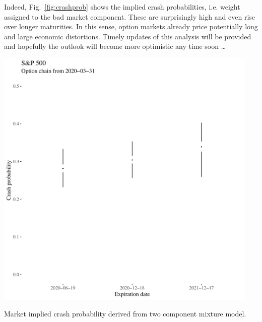 \documentclass[a4paper]{tufte-handout}
\newcommand{\fig}[1]{Fig.~\ref{fig:#1}}
\begin{document}
Indeed, \fig{crashprob} shows the implied crash probabilities,
i.e. weight assigned to the bad market component. These are
surprisingly high and even rise over longer maturities. In this sense,
option markets already price potentially long and large economic
distortions. Timely updates of this analysis will be provided and
hopefully the outlook will become more optimistic any time soon \ldots
\begin{marginfigure}
  \begin{center}
    \includegraphics[width=0.95\textwidth]{../figs/crash_prob.pdf}
  \end{center}
  \caption{\label{fig:crashprob} Market implied crash probability
    derived from two component mixture model.}
\end{marginfigure}

\cite{https://doi.org/10.1101/2020.03.25.20043109,kubinec,https://doi.org/10.1101/2020.03.12.20034595}




\appendix

\end{document}

